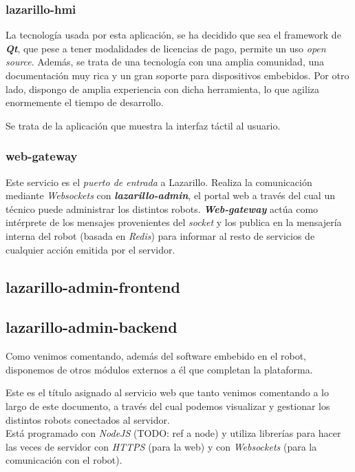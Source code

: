 \subsubsection{lazarillo-hmi}

La tecnología usada por esta aplicación, se ha decidido que sea el framework de \textbf{\textit{Qt}}, que pese a tener modalidades de licencias de pago, permite un uso \textit{open source}. Además, se trata de una tecnología con una amplia comunidad, una documentación muy rica y un gran soporte para dispositivos embebidos. Por otro lado, dispongo de amplia experiencia con dicha herramienta, lo que agiliza enormemente el tiempo de desarrollo.

Se trata de la aplicación que muestra la interfaz táctil al usuario.

\subsubsection{web-gateway}

Este servicio es el \textit{puerto de entrada} a Lazarillo. Realiza la comunicación mediante \textit{Websockets} con \textbf{\textit{lazarillo-admin}}, el portal web a través del cual un técnico puede administrar los distintos robots. \textit{\textbf{Web-gateway}} actúa como intérprete de los mensajes provenientes del \textit{socket} y los publica en la mensajería interna del robot (basada en \textit{Redis}) para informar al resto de servicios de cualquier acción emitida por el servidor.



\subsection{lazarillo-admin-frontend}
\subsection{lazarillo-admin-backend}

Como venimos comentando, además del software embebido en el robot, disponemos de otros módulos externos a él que completan la plataforma.

Este es el título asignado al servicio web que tanto venimos comentando a lo largo de este documento, a través del cual podemos visualizar y gestionar los distintos robots conectados al servidor.\\

Está programado con \textit{NodeJS} (TODO: ref a node) y utiliza librerías para hacer las veces de servidor con \textit{HTTPS} (para la web) y con \textit{Websockets} (para la comunicación con el robot).\\
